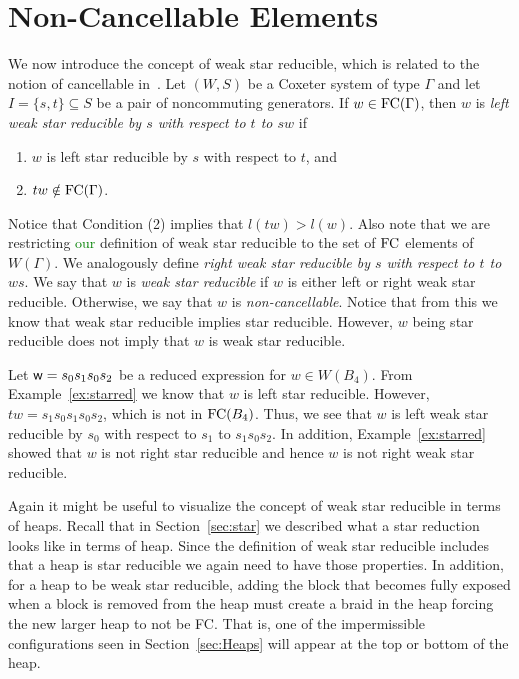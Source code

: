

\section{Non-Cancellable Elements}\label{sec:noncancel}
 
We now introduce the concept of weak star reducible, which is related to the notion of cancellable in~\cite{Fan1997}. Let $(W,S)$ be a Coxeter system of type $\Gamma$ and let $I=\{s,t\} \subseteq S$ be a pair of noncommuting generators. If $w  \in \mathrm{FC}(\Gamma)$, then $w$ is \emph{left weak star reducible by $s$ with respect to $t$ to $sw$} if
\begin{enumerate}[leftmargin=2cm]
\item $w$ is left star reducible by $s$ with respect to $t$, and
\item $tw \notin \mathrm{FC}(\Gamma)$.	
\end{enumerate}
Notice that Condition (2) implies that $l(tw)>l(w)$. Also note that we are restricting \textcolor{green}{our} definition of weak star reducible to the set of $\mathrm{FC}$ elements of $W(\Gamma)$. We analogously define \emph{right weak star reducible by $s$ with respect to $t$ to $ws$}. We say that $w$ is \emph{weak star reducible} if $w$ is either left or right weak star reducible. Otherwise, we say that $w$ is \emph{non-cancellable}. Notice that from this we know that weak star reducible implies star reducible. However, $w$ being star reducible does not imply that $w$ is weak star reducible.

\begin{example}\label{ex:noncancel}
 Let $\mathsf{w}=s_0s_1s_0s_2$ be a reduced expression for $w \in W(B_4)$. From Example~\ref{ex:starred} we know that $w$ is left star reducible. However, $tw=s_1s_0s_1s_0s_2$, which is not in $\mathrm{FC}(B_4)$. Thus, we see that $w$ is left weak star reducible by $s_0$ with respect to $s_1$ to $s_1s_0s_2$. In addition, Example~\ref{ex:starred} showed that $w$ is not right star reducible and hence $w$ is not right weak star reducible. 
\end{example}

Again it might be useful to visualize the concept of weak star reducible in terms of heaps. Recall that in Section~\ref{sec:star} we described what a star reduction looks like in terms of heap. Since the definition of weak star reducible includes that a heap is star reducible we again need to have those properties. In addition, for a heap to be weak star reducible, adding the block that becomes fully exposed when a block is removed from the heap must create a braid in the heap forcing the new larger heap to not be FC. That is, one of the impermissible configurations seen in Section~\ref{sec:Heaps} will appear at the top or bottom of the heap.

